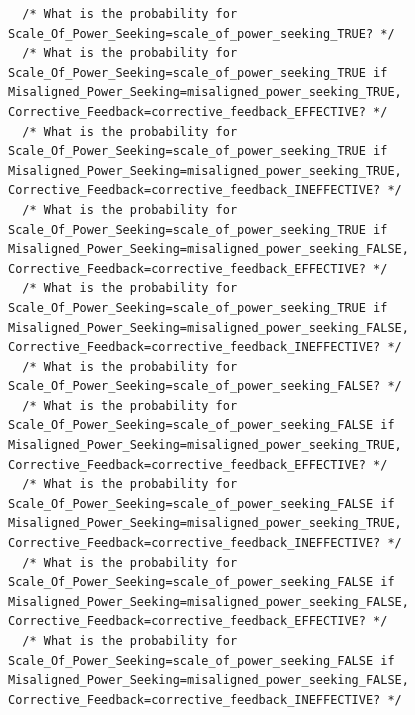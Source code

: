 \documentclass[
  11pt,
  letterpaper,
]{book}
\begin{document}
\begin{verbatim}
  /* What is the probability for Scale_Of_Power_Seeking=scale_of_power_seeking_TRUE? */
  /* What is the probability for Scale_Of_Power_Seeking=scale_of_power_seeking_TRUE if Misaligned_Power_Seeking=misaligned_power_seeking_TRUE, Corrective_Feedback=corrective_feedback_EFFECTIVE? */
  /* What is the probability for Scale_Of_Power_Seeking=scale_of_power_seeking_TRUE if Misaligned_Power_Seeking=misaligned_power_seeking_TRUE, Corrective_Feedback=corrective_feedback_INEFFECTIVE? */
  /* What is the probability for Scale_Of_Power_Seeking=scale_of_power_seeking_TRUE if Misaligned_Power_Seeking=misaligned_power_seeking_FALSE, Corrective_Feedback=corrective_feedback_EFFECTIVE? */
  /* What is the probability for Scale_Of_Power_Seeking=scale_of_power_seeking_TRUE if Misaligned_Power_Seeking=misaligned_power_seeking_FALSE, Corrective_Feedback=corrective_feedback_INEFFECTIVE? */
  /* What is the probability for Scale_Of_Power_Seeking=scale_of_power_seeking_FALSE? */
  /* What is the probability for Scale_Of_Power_Seeking=scale_of_power_seeking_FALSE if Misaligned_Power_Seeking=misaligned_power_seeking_TRUE, Corrective_Feedback=corrective_feedback_EFFECTIVE? */
  /* What is the probability for Scale_Of_Power_Seeking=scale_of_power_seeking_FALSE if Misaligned_Power_Seeking=misaligned_power_seeking_TRUE, Corrective_Feedback=corrective_feedback_INEFFECTIVE? */
  /* What is the probability for Scale_Of_Power_Seeking=scale_of_power_seeking_FALSE if Misaligned_Power_Seeking=misaligned_power_seeking_FALSE, Corrective_Feedback=corrective_feedback_EFFECTIVE? */
  /* What is the probability for Scale_Of_Power_Seeking=scale_of_power_seeking_FALSE if Misaligned_Power_Seeking=misaligned_power_seeking_FALSE, Corrective_Feedback=corrective_feedback_INEFFECTIVE? */

\end{verbatim}
\end{document}
